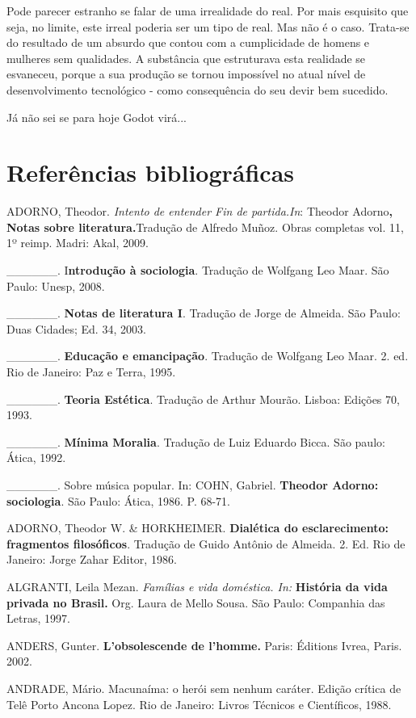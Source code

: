 Pode parecer estranho se falar de uma irrealidade do real. Por mais
esquisito que seja, no limite, este irreal poderia ser um tipo de real.
Mas não é o caso. Trata-se do resultado de um absurdo que contou com a
cumplicidade de homens e mulheres sem qualidades. A substância que
estruturava esta realidade se esvaneceu, porque a sua produção se tornou
impossível no atual nível de desenvolvimento tecnológico - como
consequência do seu devir bem sucedido.

Já não sei se para hoje Godot virá...

\chapter{Referências bibliográficas}

ADORNO, Theodor. \emph{Intento de entender Fin de partida.In}: Theodor
Adorno\textbf{, Notas sobre literatura.}Tradução de Alfredo Muñoz. Obras
completas vol. 11, 1º reimp. Madri: Akal, 2009.

\_\_\_\_\_\_. I\textbf{ntrodução à sociologia}. Tradução de Wolfgang Leo
Maar. São Paulo: Unesp, 2008.

\_\_\_\_\_\_. \textbf{Notas de literatura I}. Tradução de Jorge de
Almeida. São Paulo: Duas Cidades; Ed. 34, 2003.

\_\_\_\_\_\_. \textbf{Educação e emancipação}. Tradução de Wolfgang Leo
Maar. 2. ed. Rio de Janeiro: Paz e Terra, 1995.

\_\_\_\_\_\_. \textbf{Teoria Estética}. Tradução de Arthur Mourão.
Lisboa: Edições 70, 1993.

\_\_\_\_\_\_. \textbf{Mínima Moralia}. Tradução de Luiz Eduardo Bicca.
São paulo: Ática, 1992.

\_\_\_\_\_\_. Sobre música popular. In: COHN, Gabriel. \textbf{Theodor
Adorno: sociologia}. São Paulo: Ática, 1986. P. 68-71.

ADORNO, Theodor W. \& HORKHEIMER. \textbf{Dialética do esclarecimento:
fragmentos filosóficos}. Tradução de Guido Antônio de Almeida. 2. Ed.
Rio de Janeiro: Jorge Zahar Editor, 1986.

ALGRANTI, Leila Mezan. \emph{Famílias e vida doméstica. In:}
\textbf{História da vida privada no Brasil.} Org. Laura de Mello Sousa.
São Paulo: Companhia das Letras, 1997.

ANDERS, Gunter. \textbf{L'obsolescende de l'homme.} Paris: Éditions
Ivrea, Paris. 2002.

ANDRADE, Mário. Macunaíma: o herói sem nenhum caráter. Edição crítica de
Telê Porto Ancona Lopez. Rio de Janeiro: Livros Técnicos e Científicos,
1988.

